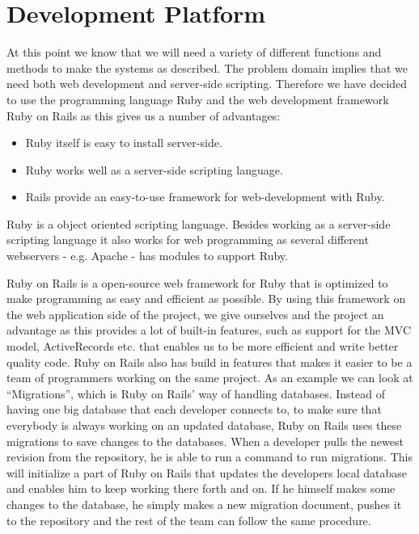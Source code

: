 \section{Development Platform}
At this point we know that we will need a variety of different functions and methods to make the systems as described.
The problem domain implies that we need both web development and server-side scripting.
Therefore we have decided to use the programming language Ruby and the web development framework Ruby on Rails as this gives us a number of advantages:

\begin{itemize}
	\item Ruby itself is easy to install server-side.
	\item Ruby works well as a server-side scripting language.
	\item Rails provide an easy-to-use framework for web-development with Ruby.
\end{itemize}

Ruby is a object oriented scripting language.
Besides working as a server-side scripting language it also works for web programming as several different webservers - e.g. Apache - has modules to support Ruby.

Ruby on Rails is a open-source web framework for Ruby that is optimized to make programming as easy and efficient as possible.
By using this framework on the web application side of the project, we give ourselves and the project an advantage as this provides a lot of built-in features, such as support for the MVC model, ActiveRecords etc. that enables us to be more efficient and write better quality code.
Ruby on Rails also has build in features that makes it easier to be a team of programmers working on the same project.
As an example we can look at ``Migrations'', which is Ruby on Rails' way of handling databases.
Instead of having one big database that each developer connects to, to make sure that everybody is always working on an updated database, Ruby on Rails uses these migrations to save changes to the databases.
When a developer pulls the newest revision from the repository, he is able to run a command to run migrations.
This will initialize a part of Ruby on Rails that updates the developers local database and enables him to keep working there forth and on.
If he himself makes some changes to the database, he simply makes a new migration document, pushes it to the repository and the rest of the team can follow the same procedure.

